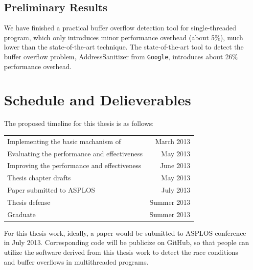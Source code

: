 \subsection{Preliminary Results}
We have finished a practical buffer overflow detection tool for single-threaded program, which only
introduces minor performance overhead (about 5\%), much lower than the state-of-the-art technique.
The state-of-the-art tool to detect the buffer overflow problem,
AddressSanitizer from \texttt{Google}, introduces about 26\% performance overhead.

\section{Schedule and Delieverables}

The proposed timeline for this thesis is as follows:

\begin{table}[ht]
\centering
\begin{tabular}{ l r}
Implementing the basic machanism of \stopgap{} & March 2013 \\ 
Evaluating the performance and effectiveness & May 2013 \\
Improving the performance and effectiveness & June 2013 \\
Thesis chapter drafts & May 2013 \\ 
Paper submitted to ASPLOS & July 2013 \\
Thesis defense  & Summer 2013\\
Graduate & Summer 2013 \\
\end{tabular}
{\label{table:timeline}}
\end{table}

For this thesis work, ideally, a paper would be submitted to ASPLOS conference in July 2013. 
Corresponding code will be publicize on GitHub, so that people can utilize the software
derived from this thesis work
to detect the race conditions and buffer overflows in multithreaded programs.
